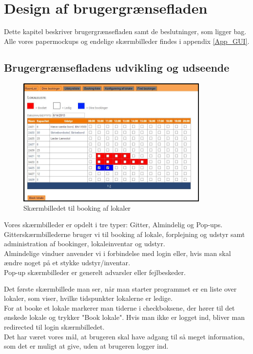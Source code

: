 \chapter{Design af brugergrænsefladen}
\label{Design_G}
Dette kapitel beskriver brugergrænsefladen samt de beslutninger, som ligger bag. Alle vores papermockups og endelige skærmbilleder findes i appendix \ref{App_GUI}.

\section{Brugergrænsefladens udvikling og udseende}
\label{Design_G_Development}
\begin{figure}[h!]
  \centering
    \includegraphics[width=0.85\textwidth]{Appendix/GUI-Prototype/DigitalMockup/GridEksempel}
  \caption{Skærmbilledet til booking af lokaler}
\label{Design_G_Development_FinalGrid}
\end{figure}

Vores skærmbilleder er opdelt i tre typer: Gitter, Almindelig og Pop-ups. 
\\Gitterskærmbillederne bruger vi til booking af lokale, forplejning og udstyr samt administration af bookinger, lokaleinventar og udstyr.
\\Almindelige vinduer anvender vi i forbindelse med login eller, hvis man skal ændre noget på et stykke udstyr/inventar.
\\Pop-up skærmbilleder er generelt advarsler eller fejlbeskeder.

Det første skærmbillede man ser, når man starter programmet er en liste over lokaler, som viser, hvilke tidspunkter lokalerne er ledige.
\\For at booke et lokale markerer man tiderne i checkboksene, der hører til det ønskede lokale og trykker "Book lokale". Hvis man ikke er logget ind, bliver man redirected til login skærmbilledet.
\\Det har været vores mål, at brugeren skal have adgang til så meget information, som det er muligt at give, uden at brugeren logger ind.

